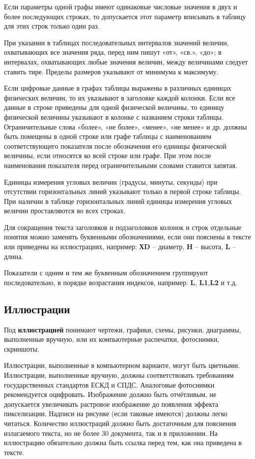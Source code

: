 Если параметры одной графы имеют одинаковые числовые значения в двух и более
последующих строках, то допускается этот параметр вписывать в таблицу для этих строк только
один раз.

При указании в таблицах последовательных интервалов значений величин,
охватывающих все значения ряда, перед ним пишут «от», «св.», «до»; в интервалах,
охватывающих любые значения величин, между величинами следует ставить тире. Пределы
размеров указывают от минимума к максимуму.

Если цифровые данные в графах таблицы выражены в различных единицах физических
величин, то их указывают в заголовке каждой колонки. Если все данные в строке приведены для
одной физической величины, то единицу физической величины указывают в колонке с
названием строки таблицы. Ограничительные слова «более», «не более», «менее», «не менее» и
др. должны быть помещены в одной строке или графе таблицы с наименованием
соответствующего показателя после обозначения его единицы физической величины, если
относятся ко всей строке или графе. При этом после наименования показателя перед
ограничительными словами ставится запятая.

Единицы измерения угловых величин (градусы, минуты, секунды) при отсутствии
горизонтальных линий указывают только в первой строке таблицы. При наличии в таблице
горизонтальных линий единицы измерения угловых величин проставляются во всех строках.

Для сокращения текста заголовков и подзаголовков колонок и строк отдельные понятия
можно заменять буквенными обозначениями, если они пояснены в тексте или приведены на
иллюстрациях, например: {\bf ХD} -- диаметр, {\bf H} --  высота, {\bf L} -- длина.

Показатели с одним и тем же буквенным обозначением группируют последовательно, в
порядке возрастания индексов, например: {\bf L}, {\bf L1},{\bf L2} и т.д.

\subsection{Иллюстрации}
Под {\bf иллюстрацией} понимают чертежи, графики, схемы, рисунки, диаграммы, выполненные
вручную, или их компьютерные распечатки, фотоснимки, скриншоты.

Иллюстрации, выполненные в компьютерном варианте, могут быть цветными. Иллюстрации, 
выполненные вручную, должны соответствовать требованиям государственных стандартов
ЕСКД и СПДС. Аналоговые фотоснимки рекомендуется оцифровать. Изображение должно 
быть отчётливым, не допускается увеличивать растровое изображение до появления
эффекта пикселизации. Надписи на рисунке (если таковые имеются) должны легко читаться.
Количество иллюстраций должно быть достаточным для пояснения излагаемого текста,
но не более 30%
документа, так и в приложении. На иллюстрацию обязательно должна быть ссылка перед тем,
как она приведена в тексте.

